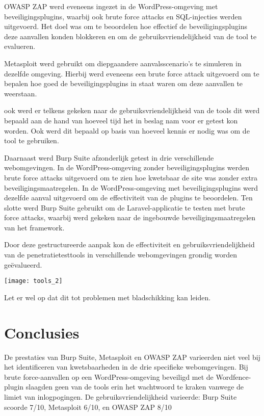 \documentclass[a0,portrait]{hogent-poster}
\begin{document}
\begin{multicols}{2}
OWASP ZAP werd eveneens ingezet in de WordPress-omgeving met beveiligingsplugins, waarbij ook brute force attacks 
en SQL-injecties werden uitgevoerd. Het doel was om te beoordelen hoe effectief de beveiligingsplugins deze aanvallen 
konden blokkeren en om de gebruiksvriendelijkheid van de tool te evalueren.

Metasploit werd gebruikt om diepgaandere aanvalsscenario's te simuleren in dezelfde omgeving. Hierbij werd eveneens een
brute force attack uitgevoerd om te bepalen hoe goed de beveiligingsplugins in staat waren om deze  aanvallen 
te weerstaan.

ook werd er telkens gekeken naar de gebruiksvriendelijkheid van de tools dit werd bepaald aan de hand van hoeveel 
tijd het in beslag nam voor er getest kon worden. Ook werd dit bepaald op basis van hoeveel kennis er nodig was om 
de tool te gebruiken.

Daarnaast werd Burp Suite afzonderlijk getest in drie verschillende webomgevingen. In de WordPress-omgeving zonder 
beveiligingsplugins werden brute force attacks uitgevoerd om te zien hoe kwetsbaar de site was zonder 
extra beveiligingsmaatregelen. In de WordPress-omgeving met beveiligingsplugins werd dezelfde aanval uitgevoerd om 
de effectiviteit van de plugins te beoordelen. Ten slotte werd Burp Suite gebruikt om de Laravel-applicatie te testen met 
brute force attacks, waarbij werd gekeken naar de ingebouwde beveiligingsmaatregelen van het framework.

Door deze gestructureerde aanpak kon de effectiviteit en gebruiksvriendelijkheid van de penetratietesttools in 
verschillende webomgevingen grondig worden geëvalueerd.

\begin{center}
  \captionsetup{type=figure}
  \texttt{[image: tools\_2]}
\end{center}

Let er wel op dat dit tot problemen met bladschikking kan leiden.

\section{Conclusies}
De prestaties van Burp Suite, Metasploit en OWASP ZAP varieerden niet veel bij het identificeren van kwetsbaarheden in de 
drie specifieke webomgevingen. Bij brute force-aanvallen op een WordPress-omgeving beveiligd met de Wordfence-plugin 
slaagden geen van de tools erin het wachtwoord te kraken vanwege de limiet van inlogpogingen. De gebruiksvriendelijkheid 
varieerde: Burp Suite scoorde 7/10, Metasploit 6/10, en OWASP ZAP 8/10


\end{multicols}
\end{document}
